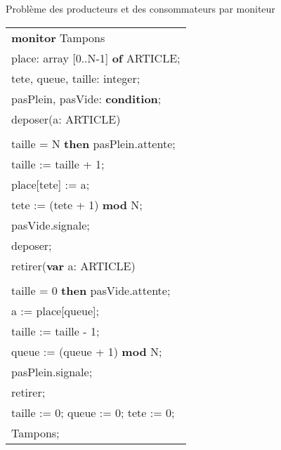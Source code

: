 \begin{algorithm}[!ht]
\caption{Problème des producteurs et des consommateurs par moniteur}\label{moniteur:ProdCons}
\centering
\begin{tabular}{l}
{\bf monitor} Tampons \\
\hspace{0.3cm}{\bf var} place: array [0..N-1] {\bf of} ARTICLE; \\
\hspace{0.3cm}{\bf var} tete, queue, taille: integer; \\
\hspace{0.3cm}{\bf var} pasPlein, pasVide: {\bf condition}; \\

\hspace{0.3cm}{\bf entry procedure} deposer(a: ARTICLE) \\
\hspace{0.6cm}{\bf begin} \\
\hspace{1cm}{\bf if} taille = N {\bf then} pasPlein.attente; \\
\hspace{1cm}taille := taille + 1; \\
\hspace{1cm}place[tete] := a; \\
\hspace{1cm}tete := (tete + 1) {\bf mod} N; \\
\hspace{1cm}pasVide.signale; \\
\hspace{0.6cm}{\bf end} deposer; \\

\hspace{0.3cm}{\bf entry procedure} retirer({\bf var} a: ARTICLE) \\
\hspace{0.6cm}{\bf begin} \\
\hspace{1cm}{\bf if} taille = 0 {\bf then} pasVide.attente; \\
\hspace{1cm}a := place[queue]; \\
\hspace{1cm}taille := taille - 1; \\
\hspace{1cm}queue := (queue + 1) {\bf mod} N; \\
\hspace{1cm}pasPlein.signale; \\
\hspace{0.6cm}{\bf end} retirer; \\

\hspace{0.3cm}{\bf begin} taille := 0; queue := 0; tete := 0; \\
\hspace{0.3cm}{\bf end} Tampons;
\end{tabular}

\end{algorithm}
